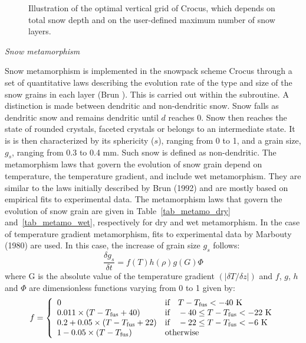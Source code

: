 \begin{figure}[h!]
\begin{center}
\caption{Illustration of the optimal vertical grid of Crocus, which
  depends on total snow depth and on the user-defined maximum number
  of snow layers. \label{fig:crocus-grid}}
\end{center}
\end{figure}


{\it Snow metamorphism}

Snow metamorphism is implemented in the snowpack scheme Crocus through
a set of quantitative laws describing the evolution rate of the type
and size of the snow grains in each layer (Brun ). This is
carried out within the subroutine. A distinction is made between
dendritic and non-dendritic snow. Snow falls as dendritic snow and
remains dendritic until $d$ reaches 0. Snow then reaches the state of
rounded crystals, faceted crystals or belongs to an intermediate
state. It is is then characterized by its sphericity ($s$), ranging
from 0 to 1, and a grain size, $g_s$, ranging from 0.3 to 0.4 mm. Such
snow is defined as non-dendritic. The metamorphism laws that govern
the evolution of snow grain depend on temperature, the temperature
gradient, and include wet metamorphism. They are similar to the laws
initially described by Brun \etal (1992) and are mostly based on
empirical fits to experimental data. The metamorphism laws that govern
the evolution of snow grain are given in Table~\ref{tab_metamo_dry}
and~\ref{tab_metamo_wet}, respectively for dry and wet
metamorphism. In the case of temperature gradient metamorphism, fits
to experimental data by Marbouty (1980)\nocite{marbouty1980} are
used. In this case, the increase of grain size $g_s$ follows:
%
\begin{equation}
\frac{\delta g_s}{\delta t} = f(T)h(\rho)g(G)\Phi
\end{equation}
where G is the absolute value of the temperature gradient $(|\delta T
/ \delta z|)$ and $f$, $g$, $h$ and $\Phi$ are dimensionless functions
varying from 0 to 1 given by:
%
\begin{equation}
f = \left\{
    \begin{array}{ll}
       0 & \mbox{if}\quad T-T_{\rm fus}  < -40~\mathrm{K} \\
       0.011\times(T-T_{\rm fus}+40) & \mbox{if} \quad -40\le T-T_{\rm fus}< -22~\mathrm{K}  \\
       0.2+0.05\times(T-T_{\rm fus}+22) & \mbox{if} \quad -22\le T-T_{\rm fus}< -6~\mathrm{K}  \\     
       1-0.05\times(T-T_{\rm fus})&\mbox{otherwise}
    \end{array}
\right.
\label{eqn_fmarb}
\end{equation}
